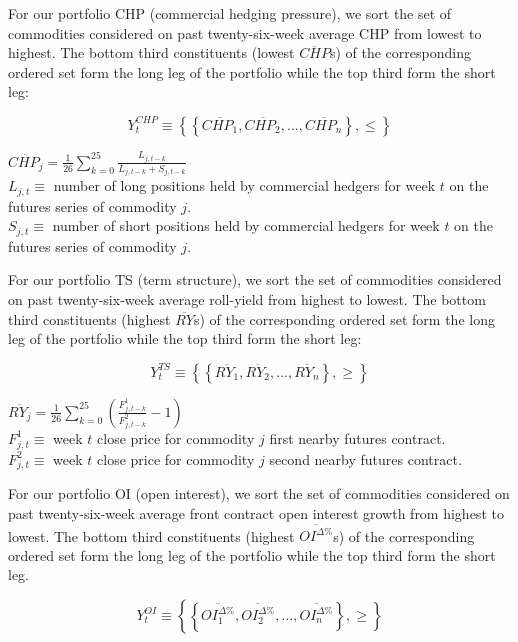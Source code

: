 \documentclass[]{elsarticle} %
\begin{document}
\bigskip

For our portfolio CHP (commercial hedging pressure), we sort the set of commodities considered on past twenty-six-week average CHP from lowest to highest. The bottom third constituents (lowest \(\overline{CHP}\)s) of the corresponding ordered set form the long leg of the portfolio while the top third form the short leg:

\[Y_{t}^{CHP}\equiv\left \{ \left \{ \overline{CHP_{1}}, \overline{CHP_{2}}, ..., \overline{CHP_{n}} \right \}, \leq \right \}\]

\(\overline{CHP_{j}}=\frac{1}{26}\sum_{k=0}^{25}\frac{L_{j,t-k}}{L_{j,t-k}+S_{j,t-k}}\)\\
\(L_{j,t}\equiv\) number of long positions held by commercial hedgers for week \(t\) on the futures series of commodity \(j\).\\
\(S_{j,t}\equiv\) number of short positions held by commercial hedgers for week \(t\) on the futures series of commodity \(j\).

\bigskip

For our portfolio TS (term structure), we sort the set of commodities considered on past twenty-six-week average roll-yield from highest to lowest. The bottom third constituents (highest \(\overline{RY}\)s) of the corresponding ordered set form the long leg of the portfolio while the top third form the short leg:

\[Y_{t}^{TS}\equiv\left \{ \left \{ \overline{RY_{1}}, \overline{RY_{2}}, ..., \overline{RY_{n}} \right \}, \geq \right \}\]

\(\overline{RY_{j}}=\frac{1}{26}\sum_{k=0}^{25}(\frac{F_{j,t-k}^{1}}{F_{j,t-k}^{2}} - 1)\)\\
\(F_{j,t}^{1}\equiv\) week \(t\) close price for commodity \(j\) first nearby futures contract.\\
\(F_{j,t}^{2}\equiv\) week \(t\) close price for commodity \(j\) second nearby futures contract.

\bigskip

For our portfolio OI (open interest), we sort the set of commodities considered on past twenty-six-week average front contract open interest growth from highest to lowest. The bottom third constituents (highest \(\overline{OI^{\Delta \%}}\)s) of the corresponding ordered set form the long leg of the portfolio while the top third form the short leg.

\[Y_{t}^{OI}\equiv\left \{ \left \{ \overline{{OI}_{1}^{\Delta \%}}, \overline{{OI}_{2}^{\Delta \%}}, ..., \overline{{OI}_{n}^{\Delta \%}} \right \}, \geq \right \}\]
\end{document}
